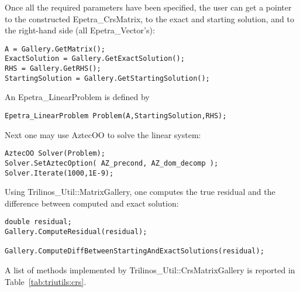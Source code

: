 Once all the required parameters have been specified, the user can get a
pointer to the constructed Epetra\_CrsMatrix, to the exact and starting
solution, and to the right-hand side (all Epetra\_Vector's):
\begin{verbatim}
A = Gallery.GetMatrix();
ExactSolution = Gallery.GetExactSolution();
RHS = Gallery.GetRHS();
StartingSolution = Gallery.GetStartingSolution();
\end{verbatim}
An Epetra\_LinearProblem is defined by
\begin{verbatim}  
Epetra_LinearProblem Problem(A,StartingSolution,RHS);
\end{verbatim}
Next one may use AztecOO to solve the linear system:
\begin{verbatim}  
AztecOO Solver(Problem);
Solver.SetAztecOption( AZ_precond, AZ_dom_decomp );  
Solver.Iterate(1000,1E-9);
\end{verbatim}
Using Trilinos\_Util::MatrixGallery, one computes the true
residual and the difference between computed and exact solution:
\begin{verbatim} 
double residual;
Gallery.ComputeResidual(residual);
  
Gallery.ComputeDiffBetweenStartingAndExactSolutions(residual);
\end{verbatim}
A list of methods implemented by Trilinos\_Util::CrsMatrixGallery is
reported in Table~\ref{tab:triutils:crs}.

